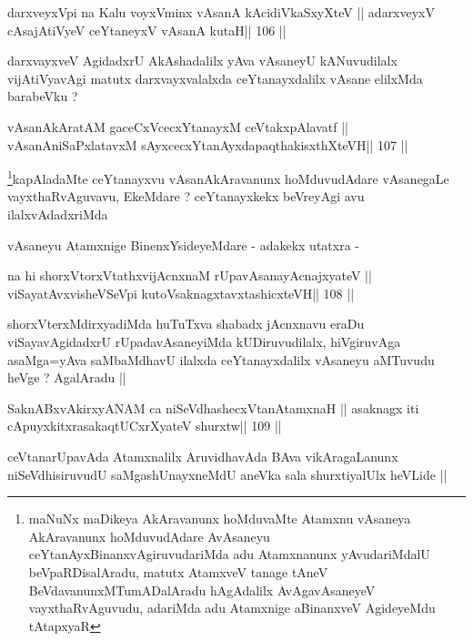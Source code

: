 \begin{shl}
darxveyxV\s pi na Kalu voyxVminx vAsanA kAcidiVkaSxyXteV ||
adarxveyxV cAsajAtiVyeV ceYtaneyxV vAsanA kutaH\hfill || 106 ||
\end{shl}

\begin{artha}
darxvayxveV AgidadxrU AkAshadalilx yAva vAsaneyU kANuvudilalx
vijAtiVyavAgi matutx darxvayxvalalxda ceYtanayxdalilx vAsane elilxMda
barabeVku ?
\end{artha}

\begin{shl}
vAsanAkAratAM gaceCxVcecxYtanayxM ceVtakxpAlavatf ||
vAsanAniSaPxlatavxM sAyxcecxYtanAyxdapaqthakisxthXteVH\hfill || 107 ||
\end{shl}

\begin{artha}
\footnote[1]{maNuNx maDikeya AkAravanunx hoMduvaMte Atamxnu vAsaneya
  AkAravanunx hoMduvudAdare AvAsaneyu ceYtanAyxBinanxvAgiruvudariMda
  adu Atamxnanunx yAvudariMdalU beVpaRDisalAradu, matutx AtamxveV
  tanage tAneV BeVdavanunxMTumADalAradu hAgAdalilx AvAgavAsaneyeV
  vayxthaRvAguvudu, adariMda adu Atamxnige aBinanxveV AgideyeMdu tAtapxyaR}kapAladaMte ceYtanayxvu vAsanAkAravanunx hoMduvudAdare
vAsanegaLe vayxthaRvAguvavu, EkeMdare ? ceYtanayxkekx beVreyAgi avu
ilalxvAdadxriMda

vAsaneyu Atamxnige BinenxYsideyeMdare - adakekx utatxra -
\end{artha}

\begin{shl}
na hi shorxVtorxVtathxvijAcnxnaM rUpavAsanayA\s cnajxyateV ||
viSayatAvxvisheVSeV\s pi kutoV\s saknagxtavxtashicxteVH\hfill || 108 ||
\end{shl}

\begin{artha}
shorxVterxMdirxyadiMda huTuTxva shabadx jAcnxnavu eraDu
viSayavAgidadxrU rUpadavAsaneyiMda kUDiruvudilalx, hiVgiruvAga
asaMga=yAva saMbaMdhavU ilalxda ceYtanayxdalilx vAsaneyu aMTuvudu
heVge ? AgalAradu ||
\end{artha}

\begin{shl}
SaknABxvAkirxyANAM ca niSeVdhashecxVtanAtamxnaH ||
asaknagx iti cApuyxkitxrasakaqtUCxrXyateV shurxtw\hfill || 109 ||
\end{shl}

\begin{artha}
ceVtanarUpavAda Atamxnalilx AruvidhavAda BAva vikAragaLanunx
niSeVdhisiruvudU saMgashUnayxneMdU aneVka sala shurxtiyalUlx heVLide ||
\end{artha}

